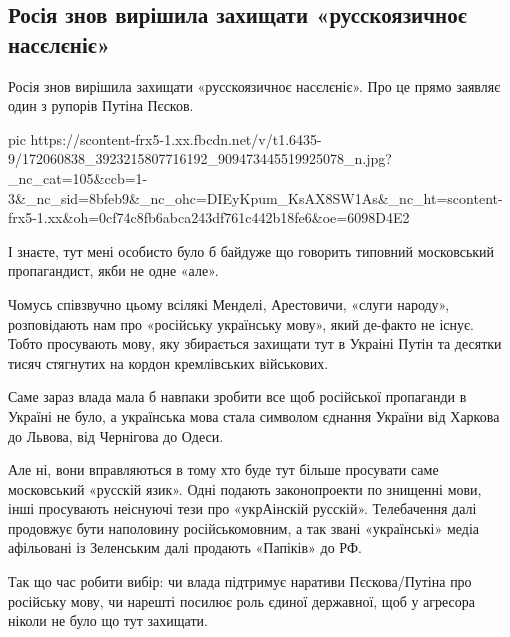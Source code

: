  
 
 
 
 
\subsection{Росія знов вирішила захищати «русскоязичноє насєлєніє»}
\label{sec:12_04_2021.fb.smolij_andrej.1.mova_jazyk}

Росія знов вирішила захищати «русскоязичноє насєлєніє». Про це прямо заявляє
один з рупорів Путіна Пєсков.

\ifcmt
  pic https://scontent-frx5-1.xx.fbcdn.net/v/t1.6435-9/172060838_3923215807716192_909473445519925078_n.jpg?_nc_cat=105&ccb=1-3&_nc_sid=8bfeb9&_nc_ohc=DIEyKpum_KsAX8SW1As&_nc_ht=scontent-frx5-1.xx&oh=0cf74c8fb6abca243df761c442b18fe6&oe=6098D4E2
\fi

І знаєте, тут мені особисто було б байдуже що говорить типовний московський
пропагандист, якби не одне «але». 

Чомусь співзвучно цьому всілякі Менделі, Арестовичи, «слуги народу»,
розповідають нам про «російську українську мову», який де-факто не існує. Тобто
просувають мову, яку збирається захищати тут в Украіні Путін та десятки тисяч
стягнутих на кордон кремлівських військових. 

Саме зараз влада мала б навпаки зробити все щоб російської пропаганди в Україні
не було, а українська мова стала символом єднання України від Харкова до
Львова, від Чернігова до Одеси. 

Але ні, вони вправляються в тому хто буде тут більше просувати саме московський
«русскій язик». Одні подають законопроекти по знищенні мови, інші просувають
неіснуючі тези про «укрАінскій русскій». Телебачення далі продовжує бути
наполовину російськомовним, а так звані «українські» медіа афільовані із
Зеленським далі продають «Папіків» до РФ.

Так що час робити вибір: чи влада підтримує наративи Пєскова/Путіна про
російську мову, чи нарешті посилює роль єдиної державної, щоб у агресора ніколи
не було що тут захищати.
